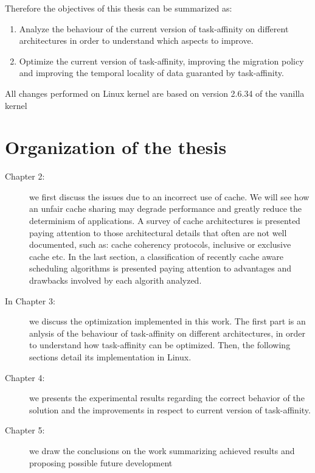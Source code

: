 Therefore the objectives of this thesis can be summarized as:

\begin{enumerate}
\item Analyze the behaviour of the current version of task-affinity on different architectures in order to understand which aspects to improve.
\item Optimize the current version of task-affinity, improving the migration policy and improving the temporal locality of data guaranted by task-affinity.
\end{enumerate}

All changes performed on Linux kernel are based on version 2.6.34 of the vanilla kernel

\section{Organization of the thesis}
\label{sec:OrganizationThesis}

\begin{description}

\item [Chapter 2:] we first discuss the issues due to an incorrect use of cache. We will see how an unfair cache sharing may degrade performance and 
greatly reduce the determinism of applications. A survey of cache architectures is presented paying attention to those architectural details that often 
are not well documented, such as: cache coherency protocols, inclusive or exclusive cache etc. In the last section, a classification of recently cache 
aware scheduling algorithms is presented paying attention to advantages and drawbacks involved by each algorith analyzed.

\item [In Chapter 3:] we discuss the optimization implemented in this work. The first part is an anlysis of the behaviour of task-affinity on different 
architectures, in order to understand how task-affinity can be optimized. Then, the following sections detail its implementation in Linux.

\item [Chapter 4:] we presents the experimental results regarding the correct behavior of the solution and the improvements in respect to current version of
task-affinity.

\item [ Chapter 5:] we draw the conclusions on the work summarizing achieved results and proposing possible future development

\end{description}
